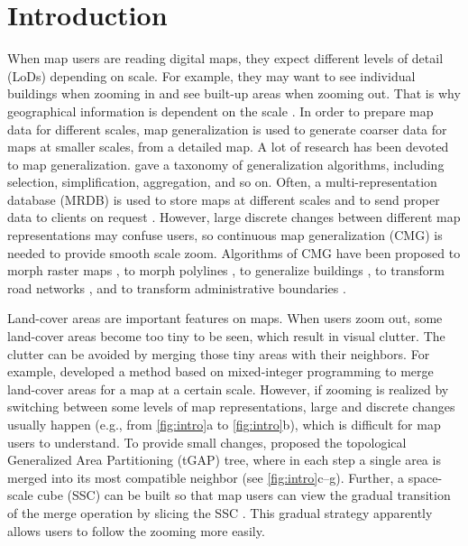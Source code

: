 \documentclass[ijgi,article,submit,moreauthors,pdftex]{Definitions/mdpi}
\begin{document}



\section{Introduction}


When map users are reading digital maps,
they expect different levels of detail (LoDs) depending on scale.
For example, they may want to see individual buildings when zooming in
and see built-up areas when zooming out.
That is why geographical information is dependent on the scale
\citep{Muller1995Generalization,Weibel1997}. 
In order to prepare map data for different scales,
map generalization is used to generate coarser data 
for maps at smaller scales,
from a detailed map.
A lot of research has been devoted to map generalization.
\citet{Mackaness2017Generalization} gave a taxonomy of 
generalization algorithms, 
including selection, simplification, aggregation, and so on.
Often, a multi-representation database (MRDB) is used to store
maps at different scales and to send proper data to clients on request
\citep[\eg][]{Hampe2004multiple}.
However, large discrete changes between different map representations
may confuse users,
so continuous map generalization (CMG) is needed to
provide smooth scale zoom.
Algorithms of CMG have been proposed 
to morph raster maps
\citep[\eg][]{Pantazis2009a,Pantazis2009b}, 
to morph polylines
\citep[\eg][]{Noellenburg2008,Peng2013LSA,Deng2015,Li2017Annealing},
to generalize buildings
\citep[\eg][]{Li2017_Building,Peng2017Building,Touya2017Progressive},
to transform road networks
\citep[\eg][]{Suba2016Road,Chimani2014Eat},
and to transform administrative boundaries
\citep[\eg][]{Peng2016Admin}.


Land-cover areas are important features on maps. 
When users zoom out,
some land-cover areas become too tiny to be seen,
which result in visual clutter.
The clutter can be avoided by merging those tiny areas 
with their neighbors.
For example, \citet{haunert2008f} developed a method based on
mixed-integer programming to merge land-cover areas
for a map at a certain scale.
However, if zooming is realized by switching between
some levels of map representations, 
large and discrete changes usually happen
(e.g., from \fig\ref{fig:intro}a to \fig\ref{fig:intro}b), 
which is difficult for map users to understand.
To provide small changes, 
\citet{vanOosterom2005} proposed 
the topological Generalized Area Partitioning (tGAP) tree,
where in each step a single area is merged into
its most compatible neighbor 
(see \fig\ref{fig:intro}c--g).
Further, a space-scale cube (SSC) can be built so that 
map users can view the gradual transition of the merge operation
by slicing the SSC \citep[see][]{Meijers2020Web}.
This gradual strategy apparently allows users 
to follow the zooming more easily.
\end{document}
